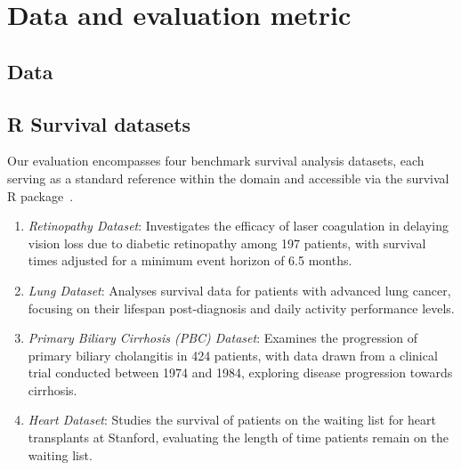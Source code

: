 \documentclass[3p,review,authoryear]{elsarticle}
\begin{document}


\section{Data and evaluation metric}

\subsection{Data}

\subsection{R Survival datasets}

Our evaluation encompasses four benchmark survival analysis datasets, each serving as a standard reference within the domain and accessible via the survival R package~\citep{survival-package}.

\begin{enumerate}
\item \textit{Retinopathy Dataset}: Investigates the efficacy of laser coagulation in delaying vision loss due to diabetic retinopathy among 197 patients, with survival times adjusted for a minimum event horizon of 6.5 months.
\item \textit{Lung Dataset}: Analyses survival data for patients with advanced lung cancer, focusing on their lifespan post-diagnosis and daily activity performance levels.
\item \textit{Primary Biliary Cirrhosis (PBC) Dataset}: Examines the progression of primary biliary cholangitis in 424 patients, with data drawn from a clinical trial conducted between 1974 and 1984, exploring disease progression towards cirrhosis.
\item \textit{Heart Dataset}: Studies the survival of patients on the waiting list for heart transplants at Stanford, evaluating the length of time patients remain on the waiting list.
\end{enumerate}
\end{document}
